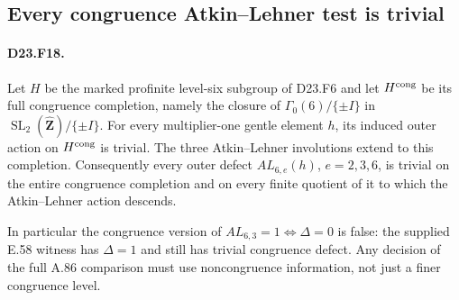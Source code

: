 \subsection{Every congruence Atkin--Lehner test is trivial}

\paragraph{D23.F18.}
Let $H$ be the marked profinite level-six subgroup of
D23.F6 and let $H^{\rm cong}$ be its full congruence
completion, namely the closure of
$\Gamma_0(6)/\{\pm I\}$ in
$\operatorname{SL}_2(\widehat{\mathbf Z})/\{\pm I\}$.
For every multiplier-one gentle element $h$, its
induced outer action on $H^{\rm cong}$ is trivial.
The three Atkin--Lehner involutions extend to this
completion. Consequently every outer defect
$AL_{6,e}(h)$, $e=2,3,6$, is trivial on the entire
congruence completion and on every finite quotient
of it to which the Atkin--Lehner action descends.

In particular the congruence version of
$AL_{6,3}=1\Longleftrightarrow\Delta=0$ is false:
the supplied E.58 witness has $\Delta=1$ and still
has trivial congruence defect. Any decision of the
full A.86 comparison must use noncongruence
information, not just a finer congruence level.

